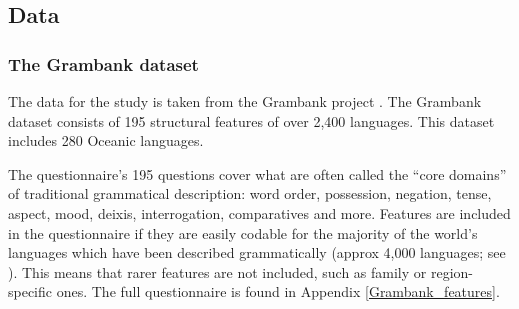 \documentclass[12pt,letterpaper]{article}
\begin{document}
\FloatBarrier
\subsection{Data}

\subsubsection{The Grambank dataset}
\label{asr:sec:GBcoverage}

The data for the study is taken from the Grambank project \citep{grambank_release}. The Grambank dataset consists of 195 structural features of over 2,400 languages. This dataset includes 280 Oceanic languages. 


 


The questionnaire's 195 questions cover what are often called the ``core domains'' of traditional grammatical description: word order, possession, negation, tense, aspect, mood, deixis, interrogation, comparatives and more. Features are included in the questionnaire if they are easily codable for the majority of the world's languages which have been described grammatically (approx 4,000 languages; see \citealt{hammarstrom2018simultaneous}). This means that rarer features are not included, such as family or region-specific ones. The full questionnaire is found in Appendix \ref{Grambank_features}.
\end{document}
